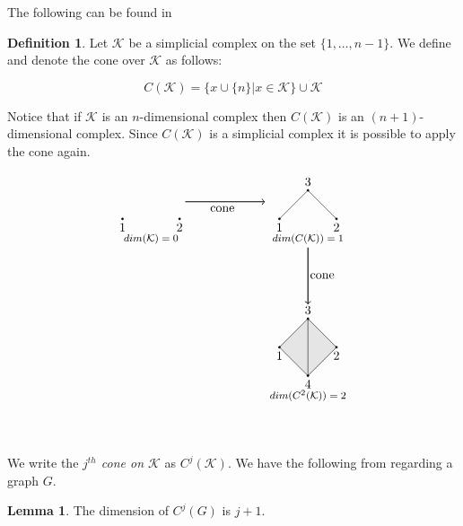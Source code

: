 \documentclass[oneside,12pt]{amsart}
\theoremstyle{definition}
\newtheorem{Definition}[Theorem]{Definition}
\newtheorem{Lemma}[Theorem]{Lemma}
\numberwithin{equation}{section}
\begin{document}
The following can be found in \cite{BP1}
\begin{Definition}\label{Cone}
Let $\mathcal{K}$ be a simplicial complex on the set $\{1,\ldots,n-1\}$. We define and denote the cone over $\mathcal{K}$ as follows:

 $$C(\mathcal{K}) =  \{   x\cup \{n\} |  x\in \mathcal{K}  \}  \cup \mathcal{K}$$

\end{Definition}

Notice that if $\mathcal{K}$ is an $n$-dimensional complex then $C(\mathcal{K})$ is an $(n+1)$-dimensional complex.  Since $C(\mathcal{K})$ is a simplicial complex it is possible to apply the cone again.

\footnotesize
\begin{minipage}{\linewidth}
$$
\begin{tikzpicture}[scale=.8]
\filldraw[black] (-1,0) node[below=.1pt]{$1$} circle (1pt);
\filldraw[black] (1,0) node[below=.1pt]{$2$} circle (1pt);
\draw (0,-.7) node{\footnotesize $dim(\mathcal{K})=0$\normalsize};
\draw[->,thick] (1.2,.6)--(4,.6);
\draw (2.5,.6) node[below=.1pt]{\text{cone}};
\draw (4.5,0)--(5.5,1)--(6.5,0);
\filldraw[black] (4.5,0) node[below=.1pt]{$1$} circle (1pt);
\filldraw[black] (6.5,0) node[below=.1pt]{$2$} circle (1pt);
\filldraw[black] (5.5,1) node[above=.1pt]{$3$} circle (1pt);
\draw[->,thick] (5.5,-1)--(5.5,-3);
\draw (5.5,-.7) node{\footnotesize $dim(C(\mathcal{K}))=1$\normalsize};
\draw (6,-2) node{\text{cone}};
\filldraw[color=gray!20] (4.5,-4.5)--(5.5,-3.5)--(6.5,-4.5)--(5.5,-5.5)--(4.5,-4.5);
\draw (4.5,-4.5)--(5.5,-3.5)--(6.5,-4.5)--(5.5,-5.5)--(4.5,-4.5);
\draw (5.5,-3.5)--(5.5,-5.5);
\filldraw[black] (4.5,-4.5) node[below=.1pt]{$1$} circle (1pt);
\filldraw[black] (6.5,-4.5) node[below=.1pt]{$2$} circle (1pt);
\filldraw[black] (5.5,-3.5) node[above=.1pt]{$3$} circle (1pt);
\filldraw[black] (5.5,-5.5) node[below=.1pt]{$4$} circle (1pt);
\draw (5.5,-6.2) node{\footnotesize $dim(C^{2}(\mathcal{K}))=2$\normalsize};
\end{tikzpicture}
$$
        \end{minipage}\\[2ex]
\normalsize

We write the \textit{$j^{th}$ cone on $\mathcal{K}$} as $C^j(\mathcal{K})$. We have the following from \cite{ALDH} regarding a  graph $G$.

\begin{Lemma}\label{Dim of n cone}
The dimension of $C^j(G)$ is $j+1$.
\end{Lemma}
\end{document}
